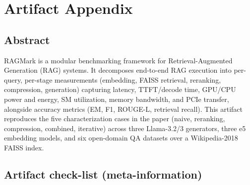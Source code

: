 \appendix
\section{Artifact Appendix}

\subsection{Abstract}

RAGMark is a modular benchmarking framework for Retrieval-Augmented
Generation (RAG) systems. It decomposes end-to-end RAG execution into
per-query, per-stage measurements (embedding, FAISS retrieval, reranking,
compression, generation) capturing latency, TTFT/decode time, GPU/CPU
power and energy, SM utilization, memory bandwidth, and PCIe transfer,
alongside accuracy metrics (EM, F1, ROUGE-L, retrieval recall). This
artifact reproduces the five characterization cases in the paper (naive,
reranking, compression, combined, iterative) across three Llama-3.2/3
generators, three e5 embedding models, and six open-domain QA datasets
over a Wikipedia-2018 FAISS index.

\subsection{Artifact check-list (meta-information)}

